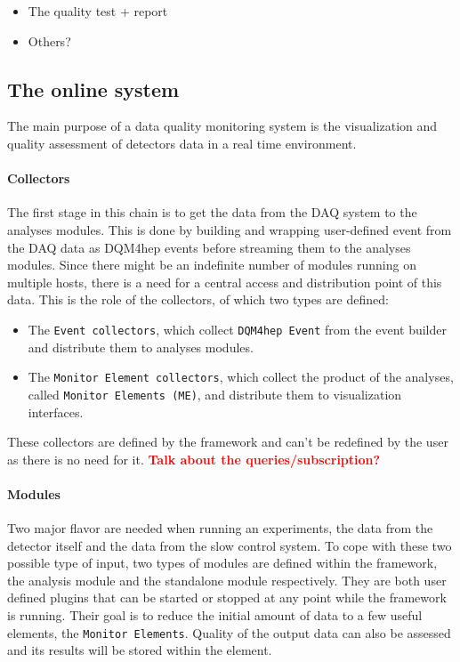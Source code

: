 \documentclass{webofc}
\begin{document}
\begin{itemize}
  \item The quality test + report
  \item Others?
\end{itemize}

\subsection{The online system}
\label{subsec:online}
The main purpose of a data quality monitoring system is the visualization and quality assessment of detectors data in a real time environment.

\paragraph{Collectors}\label{par:Collectors}
The first stage in this chain is to get the data from the DAQ system to the analyses modules.
This is done by building and wrapping user-defined event from the DAQ data as DQM4hep events before streaming them to the analyses modules.
Since there might be an indefinite number of modules running on multiple hosts, there is a need for a central access and distribution point of this data. This is the role of the collectors, of which two types are defined:

\begin{itemize}
  \item The \texttt{Event collectors}, which collect \texttt{DQM4hep Event} from the event builder and distribute them to analyses modules.  
  \item The \texttt{Monitor Element collectors}, which collect the product of the analyses, called \texttt{Monitor Elements (ME)}, and distribute them to visualization interfaces.
\end{itemize}
These collectors are defined by the framework and can't be redefined by the user as there is no need for it. 
\textcolor{red}{\textbf{Talk about the queries/subscription?}}


\paragraph{Modules}\label{par:Modules}
Two major flavor are needed when running an experiments, the data from the detector itself and the data from the slow control system.
To cope with these two possible type of input, two types of modules are defined within the framework, the analysis module and the standalone module respectively.
They are both user defined plugins that can be started or stopped at any point while the framework is running. Their goal is to reduce the initial amount of data to a few useful elements, the \texttt{Monitor Elements}. Quality of the output data can also be assessed and its results will be stored within the element.
\end{document}
